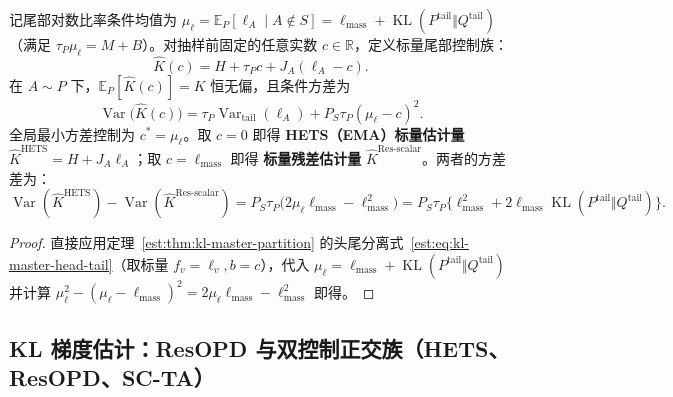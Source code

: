 \documentclass[lang=cn,scheme=chinese,openany]{elegantbook}
\newcommand{\E}{\mathbb E}
\newcommand{\KL}{\operatorname{KL}}
\newcommand{\Var}{\operatorname{Var}}
\newcommand{\tail}{\mathrm{tail}}
\newcommand{\R}{\mathbb R}
\begin{document}
\begin{theorem}
\label{est:thm:chapter3-ema-scalar}
记尾部对数比率条件均值为 $\mu_\ell=\E_P[\ell_A\mid A\notin S]=\ell_{\mathrm{mass}}+\KL(P^{\tail}\Vert Q^{\tail})$（满足 $\tau_P\mu_\ell=M+B$）。对抽样前固定的任意实数 $c\in\R$，定义标量尾部控制族：
\begin{equation}
 \widehat K(c)=H+\tau_P c+J_A(\ell_A-c).
 \label{est:eq:chapter3-ema-scalar,est:eq:chapter3-res-scalar}
\end{equation}
在 $A\sim P$ 下，$\E_P[\widehat K(c)]=K$ 恒无偏，且条件方差为
\begin{equation}
 \Var\bigl(\widehat K(c)\bigr)
 =\tau_P\Var_{\tail}(\ell_A)+P_S\tau_P(\mu_\ell-c)^2.
 \label{est:eq:chapter3-ema-scalar-var,est:eq:chapter3-res-scalar-var}
\end{equation}
全局最小方差控制为 $c^*=\mu_\ell$。取 $c=0$ 即得 \textbf{HETS（EMA）标量估计量} $\widehat K^{\mathrm{HETS}}=H+J_A\ell_A$；取 $c=\ell_{\mathrm{mass}}$ 即得 \textbf{标量残差估计量} $\widehat K^{\mathrm{Res\text{-}scalar}}$。两者的方差差为：
\begin{equation}
 \Var(\widehat K^{\mathrm{HETS}})-\Var(\widehat K^{\mathrm{Res\text{-}scalar}})
 =P_S\tau_P\bigl(2\mu_\ell\ell_{\mathrm{mass}}-\ell_{\mathrm{mass}}^2\bigr)
 =P_S\tau_P\bigl\{\ell_{\mathrm{mass}}^2+2\ell_{\mathrm{mass}}\KL(P^{\tail}\Vert Q^{\tail})\bigr\}.
 \label{est:eq:chapter3-res-scalar-gap}
\end{equation}
\end{theorem}
\begin{proof}
直接应用定理~\ref{est:thm:kl-master-partition} 的头尾分离式~\eqref{est:eq:kl-master-head-tail}（取标量 $f_v=\ell_v, b=c$），代入 $\mu_\ell=\ell_{\mathrm{mass}}+\KL(P^\tail\Vert Q^\tail)$ 并计算 $\mu_\ell^2-(\mu_\ell-\ell_{\mathrm{mass}})^2=2\mu_\ell\ell_{\mathrm{mass}}-\ell_{\mathrm{mass}}^2$ 即得。
\end{proof}

\subsection{KL 梯度估计：ResOPD 与双控制正交族（HETS、ResOPD、SC-TA）}
\end{document}
